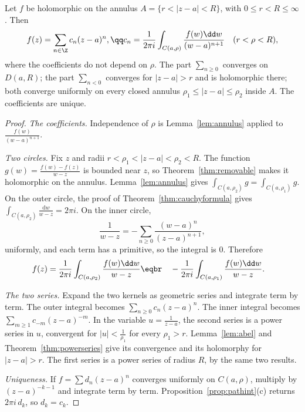 \begin{theorem}[Laurent]\label{thm:laurent}
Let $f$ be holomorphic on the annulus $A=\{r<|z-a|<R\}$, with $0\le r<R\le\infty$. Then
\[
\begin{gathered}f(z)=\sum_{n\in\Z}c_n(z-a)^n,\qq c_n=\frac1{2\pi i}\int_{C(a,\rho)}\frac{f(w)\dd w}{(w-a)^{n+1}}\quad(r<\rho<R),\end{gathered}
\]
where the coefficients do not depend on $\rho$. The part $\sum_{n\ge0}$ converges on $D(a,R)$; the part $\sum_{n<0}$ converges for $|z-a|>r$ and is
holomorphic there; both converge uniformly on every closed annulus $\rho_1\le|z-a|\le\rho_2$ inside $A$. The coefficients are unique.
\end{theorem}
\begin{proof}
\textit{The coefficients.} Independence of $\rho$ is Lemma~\ref{lem:annulus} applied to $\frac{f(w)}{(w-a)^{n+1}}$.

\textit{Two circles.} Fix $z$ and radii $r<\rho_1<|z-a|<\rho_2<R$. The function $g(w)=\frac{f(w)-f(z)}{w-z}$ is bounded near $z$, so Theorem~\ref{thm:removable} makes it holomorphic on the annulus. Lemma~\ref{lem:annulus} gives $\int_{C(a,\rho_2)}g=\int_{C(a,\rho_1)}g$. On the outer circle, the proof of Theorem~\ref{thm:cauchyformula} gives $\int_{C(a,\rho_2)}\frac{\mathrm dw}{w-z}=2\pi i$. On the inner circle,
\[
\frac1{w-z}=-\sum_{n\ge0}\frac{(w-a)^n}{(z-a)^{n+1}},
\]
uniformly, and each term has a primitive, so the integral is $0$. Therefore
\[
\begin{aligned}f(z)&=\frac1{2\pi i}\int_{C(a,\rho_2)}\frac{f(w)\dd w}{w-z}\eqbr\quad-\frac1{2\pi i}\int_{C(a,\rho_1)}\frac{f(w)\dd w}{w-z}.\end{aligned}
\]

\textit{The two series.} Expand the two kernels as geometric series and integrate term by term. The outer integral becomes $\sum_{n\ge0}c_n(z-a)^n$. The inner integral becomes $\sum_{m\ge1}c_{-m}(z-a)^{-m}$. In the variable $u=\frac1{z-a}$, the second series is a power series in $u$, convergent for $|u|<\frac1{\rho_1}$ for every $\rho_1>r$. Lemma~\ref{lem:abel} and Theorem~\ref{thm:powerseries} give its convergence and its holomorphy for $|z-a|>r$. The first series is a power series of radius $R$, by the same two results.

\textit{Uniqueness.} If $f=\sum d_n(z-a)^n$ converges uniformly on $C(a,\rho)$, multiply by $(z-a)^{-k-1}$ and integrate term by term. Proposition~\ref{prop:pathint}(c) returns $2\pi i\,d_k$, so $d_k=c_k$.
\end{proof}

